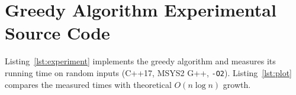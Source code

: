 \section{Greedy Algorithm Experimental Source Code}

Listing~\ref{lst:experiment} implements the greedy
algorithm and measures its running time on random
inputs (C++17, MSYS2 G++, \texttt{-O2}).
Listing~\ref{lst:plot} compares the measured times
with theoretical $O(n\log n)$ growth.




